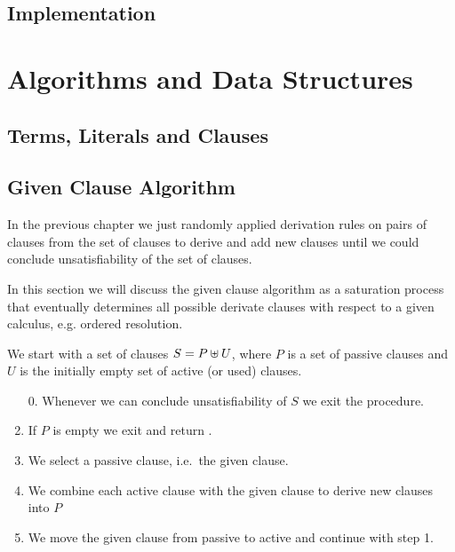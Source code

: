 
\section{Implementation}

\chapter{Algorithms and Data Structures}

\section{Terms, Literals and Clauses}




\section{Given Clause Algorithm}

In the previous chapter we just randomly applied derivation rules
on pairs of clauses from the set of clauses 
to derive and add new clauses 
until we could conclude unsatisfiability of the set of clauses.

In this section we will discuss the given clause algorithm 
as a saturation process that eventually determines all possible derivate clauses
with respect to a given calculus, e.g. ordered resolution.




\begin{procedure}
	We start with a set of clauses $S = P \uplus U$, 
	where $P$ is a set of {\myem passive} clauses 
	and $U$ is the initially empty set of {\myem active} (or used) clauses.
	\begin{enumerate}
		\item[0.] Whenever we can conclude unsatisfiability of $S$ we exit the procedure.
		\setcounter{enumi}{0}
		\item If $P$ is empty we exit and return \SAT.
		\item We select a passive clause, i.e.~the given clause.
		\item We combine each active clause with the given clause to derive new clauses into $P$
		\item We move the given clause from passive to active and continue with step 1.
	\end{enumerate}
\end{procedure}



